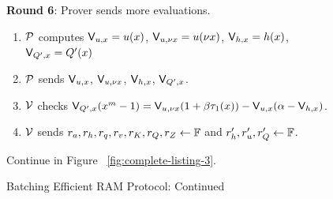 \begin{figure}[t!]
\begin{mdframed}
        {\bf Round 6}: Prover sends more evaluations.
        \begin{enumerate}[leftmargin=1em, label=\arabic*.]
            \item $\prover$ computes $\val{x}{u}=u(x)$, $\val{\nu x}{u}=u(\nu x)$, $\val{x}{h}=h(x)$, $\val{x}{Q'}=Q'(x)$
            \item $\prover$ sends $\val{x}{u}$, $\val{\nu x}{u}$, $\val{x}{h}$, $\val{x}{Q'}$.
            \item $\verifier$ checks $\val{x}{Q'}(x^m-1)=\val{\nu x}{u}(1+\beta \tau_1(x))-\val{x}{u}(\alpha - \val{x}{h})$.
            \item $\verifier$ sends $r_a, r_h, r_q, r_v, r_K, r_Q, r_Z\gets \F$ and $r_h', r_u', r_Q'\gets \F$.
        \end{enumerate}

        \begin{center}
        Continue in Figure ~\ref{fig:complete-listing-3}.
        \end{center}


    \end{mdframed}
    \caption{Batching Efficient RAM Protocol: Continued}
    \label{fig:complete-listing-2}
\end{figure}

